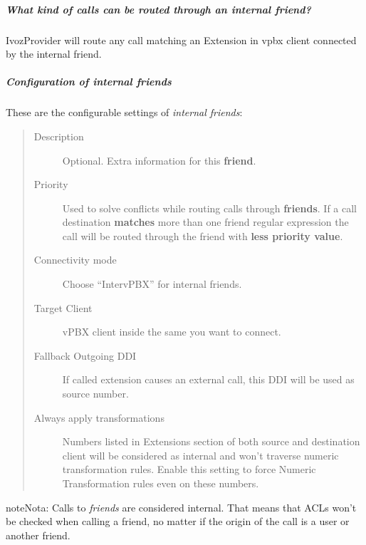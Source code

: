 \documentclass[letterpaper,10pt,spanish]{sphinxmanual}
\begin{document}
\subparagraph{What kind of calls can be routed through an \emph{internal friend}?}
\label{administration_portal/client/vpbx/routing_endpoints/friends/internal_friends:what-kind-of-calls-can-be-routed-through-an-internal-friend}
IvozProvider will route any call matching an Extension in vpbx client connected by the internal friend.


\subparagraph{Configuration of internal friends}
\label{administration_portal/client/vpbx/routing_endpoints/friends/internal_friends:configuration-of-internal-friends}
These are the configurable settings of \emph{internal friends}:
\begin{quote}
\begin{description}
\item[{Description}] \leavevmode
Optional. Extra information for this \textbf{friend}.

\item[{Priority}] \leavevmode
Used to solve conflicts while routing calls through \textbf{friends}.
If a call destination \textbf{matches} more than one friend regular expression
the call will be routed through the friend with \textbf{less priority value}.

\item[{Connectivity mode}] \leavevmode
Choose ``IntervPBX'' for internal friends.

\item[{Target Client}] \leavevmode
vPBX client inside the same {\hyperref[administration_portal/brand/settings/corporations:corporations]{}} you want to connect.

\item[{Fallback Outgoing DDI}] \leavevmode
If called extension causes an external call, this DDI will be used as source number.

\item[{Always apply transformations}] \leavevmode
Numbers listed in Extensions section of both source and destination client will be considered as internal and
won't traverse numeric transformation rules. Enable this setting to force Numeric Transformation rules even on these numbers.

\end{description}
\end{quote}

\begin{notice}{note}{Nota:}
Calls to \emph{friends} are considered internal. That means that ACLs won't
be checked when calling a friend, no matter if the origin of the call
is a user or another friend.
\end{notice}
\end{document}
